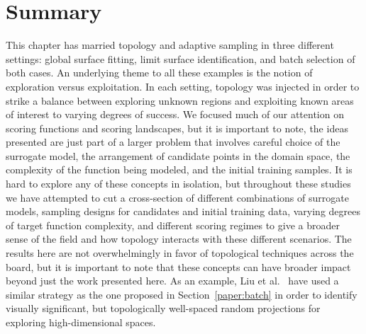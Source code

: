 \section{Summary}
This chapter has married topology and adaptive sampling in three different settings: global surface fitting, limit surface identification, and batch selection of both cases.
%
An underlying theme to all these examples is the notion of exploration versus exploitation.
%
In each setting, topology was injected in order to strike a balance between exploring unknown regions and exploiting known areas of interest to varying degrees of success.
%
We focused much of our attention on scoring functions and scoring landscapes, but it is important to note, the ideas presented are just part of a larger problem that involves careful choice of the surrogate model, the arrangement of candidate points in the domain space, the complexity of the function being modeled, and the initial training samples.
%
It is hard to explore any of these concepts in isolation, but throughout these studies we have attempted to cut a cross-section of different combinations of surrogate models, sampling designs for candidates and initial training data, varying degrees of target function complexity, and different scoring regimes to give a broader sense of the field and how topology interacts with these different scenarios.
%
The results here are not overwhelmingly in favor of topological techniques across the board, but it is important to note that these concepts can have broader impact beyond just the work presented here.
%
As an example, Liu et al.~\cite{LiuBremerJayaraman2016} have used a similar strategy as the one proposed in Section~\ref{paper:batch} in order to identify visually significant, but topologically well-spaced random projections for exploring high-dimensional spaces.

% 
